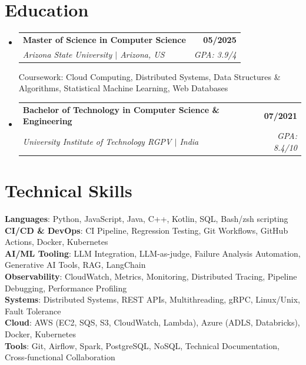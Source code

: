 \documentclass[letterpaper,11pt]{article}
\makeatletter
\newcommand{\resumeSubheading}[4]{
  \item
    \begin{tabular*}{1.0\textwidth}[t]{l@{\extracolsep{\fill}}r}
      \textbf{#1} & \textbf{#2} \\
      \textit{#3} & \textit{ #4} \\
    \end{tabular*}\vspace{-7pt}
}
\newcommand{\resumeSubHeadingListStart}{\begin{itemize}[leftmargin=0.0in, label={}]}
\newcommand{\resumeSubHeadingListEnd}{\end{itemize}}
\makeatother
\begin{document}
\section{Education}
  \resumeSubHeadingListStart
    \resumeSubheading
      {Master of Science in Computer Science}{05/2025}
      {Arizona State University $|$ Arizona, US}{GPA: 3.9/4}
      
      \small{Coursework: Cloud Computing, Distributed Systems, Data Structures \& Algorithms, Statistical Machine Learning, Web Databases}

    \resumeSubheading
      {Bachelor of Technology in Computer Science \& Engineering}{07/2021}
      {University Institute of Technology RGPV $|$ India}{GPA: 8.4/10}
  \resumeSubHeadingListEnd

\section{Technical Skills}
\begin{itemize}[leftmargin=0in, label={}]
  \small{\item{
    \textbf{Languages}{: Python, JavaScript, Java, C++, Kotlin, SQL, Bash/zsh scripting} \\
    \textbf{CI/CD \& DevOps}{: CI Pipeline, Regression Testing, Git Workflows, GitHub Actions, Docker, Kubernetes} \\
    \textbf{AI/ML Tooling}{: LLM Integration, LLM-as-judge, Failure Analysis Automation, Generative AI Tools, RAG, LangChain} \\
    \textbf{Observability}{: CloudWatch, Metrics, Monitoring, Distributed Tracing, Pipeline Debugging, Performance Profiling} \\
    \textbf{Systems}{: Distributed Systems, REST APIs, Multithreading, gRPC, Linux/Unix, Fault Tolerance} \\
    \textbf{Cloud}{: AWS (EC2, SQS, S3, CloudWatch, Lambda), Azure (ADLS, Databricks), Docker, Kubernetes} \\
    \textbf{Tools}{: Git, Airflow, Spark, PostgreSQL, NoSQL, Technical Documentation, Cross-functional Collaboration} \\
  }}
\end{itemize}
\end{document}
